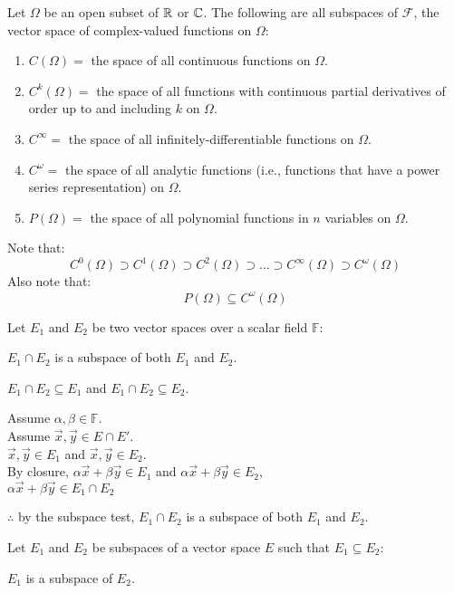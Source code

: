 \documentclass[letterpaper,12pt,fleqn]{article}
\newcommand{\F}{\mathbb{F}}
\renewcommand{\a}{\alpha}
\renewcommand{\b}{\beta}
\renewcommand{\o}{\omega}
\renewcommand{\O}{\Omega}
\newcommand{\vx}{\vec{x}}
\newcommand{\vy}{\vec{y}}
\begin{document}
\begin{examples}
  Let $\O$ be an open subset of $\mathbb{R}$ or $\mathbb{C}$. The following are all subspaces
  of $\mathcal{F}$, the vector space of complex-valued functions on $\O$:
  \begin{enumerate}
  \item $C(\O)=$ the space of all continuous functions on $\O$.
  \item $C^k(\O)=$ the space of all functions with continuous partial
    derivatives of order up to and including $k$ on $\O$.
  \item $C^{\infty}=$ the space of all infinitely-differentiable functions on
    $\O$.
  \item $C^{\o}=$ the space of all analytic functions (i.e., functions that
    have a power series representation) on $\O$.
  \item $P(\O)=$ the space of all polynomial functions in $n$ variables on
    $\O$.
  \end{enumerate}
\end{examples}

Note that:
\[C^0(\O)\supset C^1(\O)\supset C^2(\O)\supset\ldots\supset C^{\infty}(\O)
\supset C^{\o}(\O)\]
Also note that:
\[P(\O)\subseteq C^{\o}(\O)\]

\begin{theorem}
  Let $E_1$ and $E_2$ be two vector spaces over a scalar field $\F$:

  \qquad$E_1\cap E_2$ is a subspace of both $E_1$ and $E_2$.
\end{theorem}

\begin{theproof}
  $E_1\cap E_2\subseteq E_1$ and $E_1\cap E_2\subseteq E_2$.

  Assume $\a,\b\in\F$. \\
  Assume $\vx,\vy\in E\cap E'$. \\
  $\vx,\vy\in E_1$ and $\vx,\vy\in E_2$. \\
  By closure, $\a\vx+\b\vy\in E_1$ and $\a\vx+\b\vy\in E_2$, \\
  $\a\vx+\b\vy\in E_1\cap E_2$
  
  $\therefore$ by the subspace test, $E_1\cap E_2$ is a subspace of both $E_1$
  and $E_2$.
\end{theproof}

\begin{theorem}
  Let $E_1$ and $E_2$ be subspaces of a vector space $E$ such that
  $E_1\subseteq E_2$:

  \qquad$E_1$ is a subspace of $E_2$.
\end{theorem}
\end{document}
